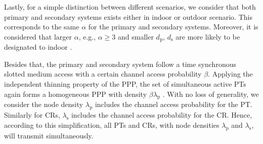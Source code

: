 \documentclass[conference, twocolumn]{IEEEtran}
\newcommand{\sub}[1]{_{\text{#1}}}
\begin{document}
Lastly,
for a simple distinction between different scenarios, we consider that both primary and secondary systems exists either in indoor or outdoor scenario.
 This corresponds to the same $\alpha$ for the primary and secondary systems. Moreover, it is considered that larger $\alpha$, e.g., $\alpha \ge 3$ and smaller $d\sub{p}$, $d\sub{s}$ are more likely to be designated to indoor \cite{Tse05}.  

Besides that, the primary and secondary system follow a time synchronous slotted medium access with a certain channel access probability $\beta$. Applying the independent thinning property of the PPP, the set of simultaneous active PTs again forms a homogeneous PPP with density $\beta \lambda\sub{p}$ \cite{Haenggi08now}. With no loss of generality, we consider the node density $\lambda\sub{p}$ includes the channel access probability for the PT. Similarly for CRs, $\lambda\sub{s}$ includes the channel access probability for the CR. Hence, according to this simplification, all PTs and CRs, with node densities $\lambda\sub{p}$ and $\lambda\sub{s}$, will transmit simultaneously. 

\end{document}
